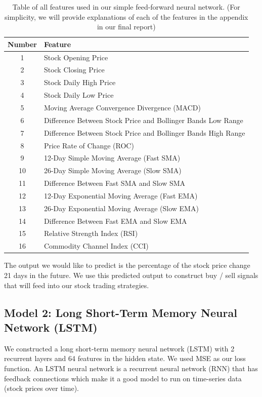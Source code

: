\documentclass[10pt]{article}
\begin{document}
\begin{table}[H]
\centering
\begin{tabular}{| c | l |} 
\hline
Number & Feature \\
\hline
1 & Stock Opening Price \\
2 & Stock Closing Price \\
3 & Stock Daily High Price \\
4 & Stock Daily Low Price \\
5 & Moving Average Convergence Divergence (MACD) \\
6 & Difference Between Stock Price and Bollinger Bands Low Range \\
7 & Difference Between Stock Price and Bollinger Bands High Range  \\
8 & Price Rate of Change (ROC) \\
9 & 12-Day Simple Moving Average (Fast SMA) \\
10 & 26-Day Simple Moving Average (Slow SMA) \\
11 & Difference Between Fast SMA and Slow SMA \\
12 & 12-Day Exponential Moving Average (Fast EMA) \\
13 & 26-Day Exponential Moving Average (Slow EMA) \\
14 & Difference Between Fast EMA and Slow EMA \\
15 & Relative Strength Index (RSI) \\
16 & Commodity Channel Index (CCI) \\
\hline
\end{tabular}
\caption{Table of all features used in our simple feed-forward neural network. (For simplicity, we will provide explanations of each of the features in the appendix in our final report)}
\label{fffeatures}
\end{table}

The output we would like to predict is the percentage of the stock price change 21 days in the future. We use this predicted output to construct buy / sell signals that will feed into our stock trading strategies.



\subsection{Model 2: Long Short-Term Memory Neural Network (LSTM)}

We constructed a long short-term memory neural network (LSTM) with 2 recurrent layers and 64 features in the hidden state. We used MSE as our loss function. An LSTM neural network is a recurrent neural network (RNN) that has feedback connections which make it a good model to run on time-series data (stock prices over time).
\end{document}
